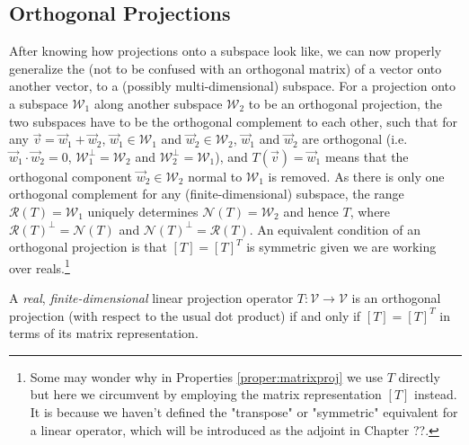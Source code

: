 \subsection{Orthogonal Projections}

After knowing how projections onto a subspace look like, we can now properly generalize the  (not to be confused with an orthogonal matrix) of a vector onto another vector, to a (possibly multi-dimensional) subspace. For a projection onto a subspace $\mathcal{W}_1$ along another subspace $\mathcal{W}_2$ to be an orthogonal projection, the two subspaces have to be the orthogonal complement to each other, such that for any $\vec{v} = \vec{w}_1 + \vec{w}_2$, $\vec{w}_1 \in \mathcal{W}_1$ and $\vec{w}_2 \in \mathcal{W}_2$, $\vec{w}_1$ and $\vec{w}_2$ are orthogonal (i.e.\ $\vec{w}_1 \cdot \vec{w}_2 = 0$, $\mathcal{W}_1^\perp = \mathcal{W}_2$ and $\mathcal{W}_2^\perp = \mathcal{W}_1$), and $T(\vec{v}) = \vec{w}_1$ means that the orthogonal component $\vec{w}_2 \in \mathcal{W}_2$ normal to $\mathcal{W}_1$ is removed. As there is only one orthogonal complement for any (finite-dimensional) subspace, the range $\mathcal{R}(T) = \mathcal{W}_1$ uniquely determines $\mathcal{N}(T) = \mathcal{W}_2$ and hence $T$, where $\mathcal{R}(T)^\perp = \mathcal{N}(T)$ and $\mathcal{N}(T)^\perp = \mathcal{R}(T)$. An equivalent condition of an orthogonal projection is that $[T] = [T]^T$ is symmetric given we are working over reals.\footnote{Some may wonder why in Properties \ref{proper:matrixproj} we use $T$ directly but here we circumvent by employing the matrix representation $[T]$ instead. It is because we haven't defined the "transpose" or "symmetric" equivalent for a linear operator, which will be introduced as the adjoint in Chapter ??.}
\begin{proper}
\label{proper:orthogonalproj}
A \textit{real}, \textit{finite-dimensional} linear projection operator $T: \mathcal{V} \to \mathcal{V}$ is an orthogonal projection (with respect to the usual dot product) if and only if $[T] = [T]^T$ in terms of its matrix representation.  
\end{proper}
